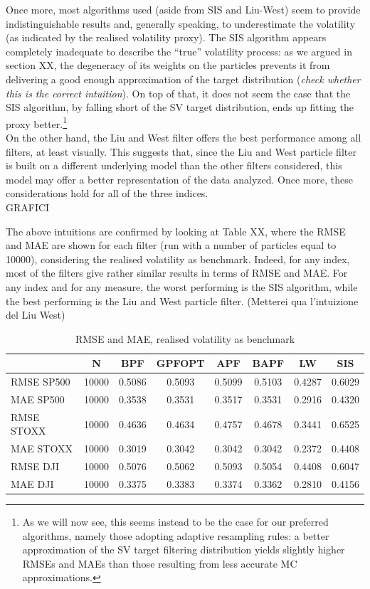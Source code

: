 \documentclass[
]{book}
\theoremstyle{break}
\theoremstyle{nonumberplain}
\begin{document}
Once more, most algorithms used (aside from SIS and Liu-West) seem to
provide indistinguishable results and, generally speaking, to
underestimate the volatility (as indicated by the realised volatility
proxy). The SIS algorithm appears completely inadequate to describe the
``true'' volatility process: as we argued in section XX, the degeneracy
of its weights on the particles prevents it from delivering a good
enough approximation of the target distribution
(\textit{check whether this is the correct intuition}). On top of that,
it does not seem the case that the SIS algorithm, by falling short of
the SV target distribution, ends up fitting the proxy
better.\footnote{As we will now see, this seems instead to be the case for our preferred algorithms, namely those adopting adaptive resampling rules: a better approximation of the SV target filtering distribution yields slightly higher RMSEs and MAEs than those resulting from less accurate MC approximations.}\\
On the other hand, the Liu and West filter offers the best performance
among all filters, at least visually. This suggests that, since the Liu
and West particle filter is built on a different underlying model than
the other filters considered, this model may offer a better
representation of the data analyzed. Once more, these considerations
hold for all of the three indices.\\

GRAFICI

The above intuitions are confirmed by looking at Table XX, where the
RMSE and MAE are shown for each filter (run with a number of particles
equal to 10000), considering the realised volatility as benchmark.
Indeed, for any index, most of the filters give rather similar results
in terms of RMSE and MAE. For any index and for any measure, the worst
performing is the SIS algorithm, while the best performing is the Liu
and West particle filter. (Metterei qua l'intuizione del Liu West)\\

\begin{longtable}[t]{lccccccc}
\caption{\label{tab:unnamed-chunk-48}RMSE and MAE, realised volatility as benchmark}\\
\toprule
  & N & BPF & GPFOPT & APF & BAPF & LW & SIS\\
\midrule
RMSE SP500 & 10000 & 0.5086 & 0.5093 & 0.5099 & 0.5103 & 0.4287 & 0.6029\\
MAE SP500 & 10000 & 0.3538 & 0.3531 & 0.3517 & 0.3531 & 0.2916 & 0.4320\\
RMSE STOXX & 10000 & 0.4636 & 0.4634 & 0.4757 & 0.4678 & 0.3441 & 0.6525\\
MAE STOXX & 10000 & 0.3019 & 0.3042 & 0.3042 & 0.3042 & 0.2372 & 0.4408\\
RMSE DJI & 10000 & 0.5076 & 0.5062 & 0.5093 & 0.5054 & 0.4408 & 0.6047\\
\addlinespace
MAE DJI & 10000 & 0.3375 & 0.3383 & 0.3374 & 0.3362 & 0.2810 & 0.4156\\
\bottomrule
\end{longtable}
\end{document}
